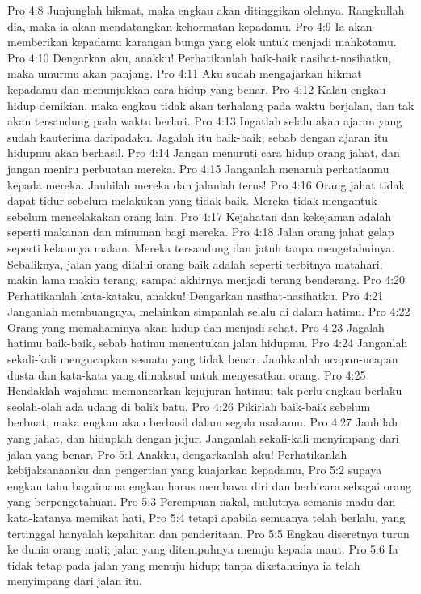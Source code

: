 Pro 4:8  Junjunglah hikmat, maka engkau akan ditinggikan olehnya. Rangkullah dia, maka ia akan mendatangkan kehormatan kepadamu.
Pro 4:9  Ia akan memberikan kepadamu karangan bunga yang elok untuk menjadi mahkotamu.
Pro 4:10  Dengarkan aku, anakku! Perhatikanlah baik-baik nasihat-nasihatku, maka umurmu akan panjang.
Pro 4:11  Aku sudah mengajarkan hikmat kepadamu dan menunjukkan cara hidup yang benar.
Pro 4:12  Kalau engkau hidup demikian, maka engkau tidak akan terhalang pada waktu berjalan, dan tak akan tersandung pada waktu berlari.
Pro 4:13  Ingatlah selalu akan ajaran yang sudah kauterima daripadaku. Jagalah itu baik-baik, sebab dengan ajaran itu hidupmu akan berhasil.
Pro 4:14  Jangan menuruti cara hidup orang jahat, dan jangan meniru perbuatan mereka.
Pro 4:15  Janganlah menaruh perhatianmu kepada mereka. Jauhilah mereka dan jalanlah terus!
Pro 4:16  Orang jahat tidak dapat tidur sebelum melakukan yang tidak baik. Mereka tidak mengantuk sebelum mencelakakan orang lain.
Pro 4:17  Kejahatan dan kekejaman adalah seperti makanan dan minuman bagi mereka.
Pro 4:18  Jalan orang jahat gelap seperti kelamnya malam. Mereka tersandung dan jatuh tanpa mengetahuinya. Sebaliknya, jalan yang dilalui orang baik adalah seperti terbitnya matahari; makin lama makin terang, sampai akhirnya menjadi terang benderang.
Pro 4:20  Perhatikanlah kata-kataku, anakku! Dengarkan nasihat-nasihatku.
Pro 4:21  Janganlah membuangnya, melainkan simpanlah selalu di dalam hatimu.
Pro 4:22  Orang yang memahaminya akan hidup dan menjadi sehat.
Pro 4:23  Jagalah hatimu baik-baik, sebab hatimu menentukan jalan hidupmu.
Pro 4:24  Janganlah sekali-kali mengucapkan sesuatu yang tidak benar. Jauhkanlah ucapan-ucapan dusta dan kata-kata yang dimaksud untuk menyesatkan orang.
Pro 4:25  Hendaklah wajahmu memancarkan kejujuran hatimu; tak perlu engkau berlaku seolah-olah ada udang di balik batu.
Pro 4:26  Pikirlah baik-baik sebelum berbuat, maka engkau akan berhasil dalam segala usahamu.
Pro 4:27  Jauhilah yang jahat, dan hiduplah dengan jujur. Janganlah sekali-kali menyimpang dari jalan yang benar.
Pro 5:1  Anakku, dengarkanlah aku! Perhatikanlah kebijaksanaanku dan pengertian yang kuajarkan kepadamu,
Pro 5:2  supaya engkau tahu bagaimana engkau harus membawa diri dan berbicara sebagai orang yang berpengetahuan.
Pro 5:3  Perempuan nakal, mulutnya semanis madu dan kata-katanya memikat hati,
Pro 5:4  tetapi apabila semuanya telah berlalu, yang tertinggal hanyalah kepahitan dan penderitaan.
Pro 5:5  Engkau diseretnya turun ke dunia orang mati; jalan yang ditempuhnya menuju kepada maut.
Pro 5:6  Ia tidak tetap pada jalan yang menuju hidup; tanpa diketahuinya ia telah menyimpang dari jalan itu.
